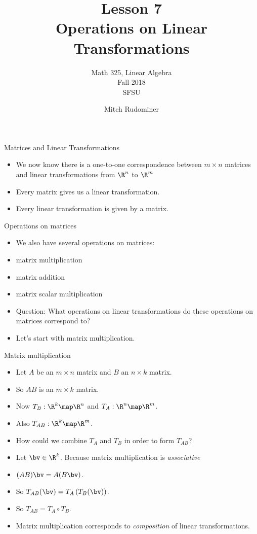 \documentclass{beamer}
\title{Lesson 7 \\ Operations on Linear Transformations}
\subtitle{Math 325, Linear Algebra \\ Fall 2018 \\ SFSU}
\author{Mitch Rudominer}
\date{}
\begin{document}
\begin{frame}
  \titlepage
\end{frame}


\begin{frame}{Matrices and Linear Transformations}

\begin{itemize}
\item We now know there is a one-to-one correspondence between $m\times n$ matrices and linear
transformations from $\R^n$ to $\R^m$
\item Every matrix gives us a linear transformation.
\item Every linear transformation is given by a matrix.
\end{itemize}

\end{frame}

\begin{frame}{Operations on matrices}

\begin{itemize}
\item We also have several operations on matrices:
\item matrix multiplication
\item matrix addition
\item matrix scalar multiplication
\item Question: What operations on linear transformations do these
operations on matrices correspond to?
\item Let's start with matrix multiplication.
\end{itemize}

\end{frame}

\begin{frame}{Matrix multiplication}

\begin{itemize}
\item Let $A$ be an $m\times n$ matrix and $B$ an $n\times k$ matrix.
\item So $A B$ is an $m\times k$ matrix.
\item Now $T_B:\R^k\map\R^n$ and $T_A:\R^n\map\R^m$.
\item Also $T_{AB}:\R^k\map\R^m$.
\item How could we combine $T_A$ and $T_B$ in order to form $T_{AB}$?
\item Let $\bv\in\R^k$. Because matrix multiplication is \emph{associative}
\item $(A B) \bv = A (B \bv)$.
\item So $T_{AB}(\bv) = T_A\left( T_B(\bv) \right)$.
\item So $T_{AB} = T_A \circ T_B$.
\item Matrix multiplication corresponds to \emph{composition} of linear transformations.
\end{itemize}
\end{frame}
\end{document}
